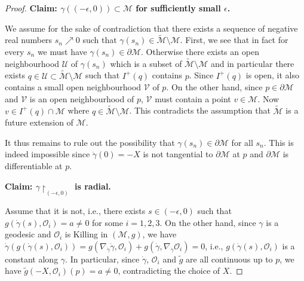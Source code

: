 \documentclass[10pt, reqno]{amsart}
\theoremstyle{definition}
\theoremstyle{remark}
\numberwithin{equation}{section}
\newcommand{\ep}{\epsilon}
\newcommand{\rd}{\partial}
\newcommand{\0}{\emptyset}
\newcommand{\nab}{\nabla}
\begin{document}
\begin{proof}
{\bf Claim: $\gamma((-\epsilon,0))\subset \mathcal M$ for sufficiently small $\epsilon$.}

We assume for the sake of contradiction that there exists a sequence of negative real numbers $s_n\nearrow 0$ such that $\gamma(s_n)\in \widetilde{\mathcal M}\setminus \mathcal M$. First, we see that in fact for every $s_n$ we must have $\gamma(s_n)\in \rd\mathcal M$. Otherwise there exists an open neighbourhood $\mathcal U$ of $\gamma(s_n)$ which is a subset of $\widetilde{\mathcal M}\setminus \mathcal M$ and in particular there exists $q\in \mathcal U\subset \widetilde{\mathcal M}\setminus \mathcal M$ such that $I^+(q)$ contains $p$. Since $I^+(q)$ is open, it also contains a small open neighbourhood $\mathcal V$ of $p$. On the other hand, since $p\in \rd\mathcal M$ and $\mathcal V$ is an open neighbourhood of $p$, $\mathcal V$ must contain a point $v\in \mathcal M$. Now $v\in I^+(q)\cap \mathcal M$ where $q\in \widetilde{\mathcal M}\setminus \mathcal M$. This contradicts the assumption that $\widetilde{\mathcal M}$ is a future extension of $\mathcal M$.

It thus remains to rule out the possibility that $\gamma(s_n)\in \rd\mathcal M$ for all $s_n$. This is indeed impossible since $\dot\gamma(0)=-X$ is not tangential to $\rd\mathcal M$ at $p$ and $\rd\mathcal M$ is differentiable at $p$.

{\bf Claim: $\gamma\restriction_{(-\ep,0)}$ is radial.} 

Assume that it is not, i.e., there exists $s\in(-\epsilon,0)$ such that $g(\dot\gamma(s),\mathcal O_i)=a\neq 0$ for some $i=1,2,3$. On the other hand, since $\gamma$ is a geodesic and $\mathcal O_i$ is Killing in $(\mathcal M, g)$, we have $\dot\gamma\left(g(\dot\gamma(s),\mathcal O_i)\right)=g(\nab_{\dot{\gamma}}\dot{\gamma},\mathcal O_i)+g(\dot{\gamma},\nab_{\dot{\gamma}}\mathcal O_i)=0$, i.e., $g(\dot\gamma(s),\mathcal O_i)$ is a constant along $\gamma$. In particular, since $\dot\gamma$, $\mathcal O_i$ and $\tilde{g}$ are all continuous up to $p$, we have 
$\tilde{g}(-X,\mathcal O_i)(p)=a\neq 0$, contradicting the choice of $X$.
\end{proof}
\end{document}
